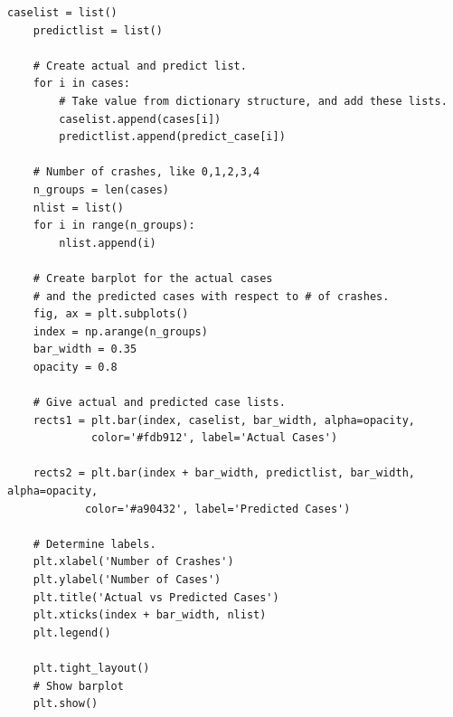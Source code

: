 \documentclass[a4 paper]{article}
\numberwithin{equation}{section}
\newcommand{\0}{\mathbf{0}}
\begin{document}
\begin{itemize}
\begin{lstlisting}[label={list:first},caption=The code block d - Draw the barplot]
	caselist = list()
	predictlist = list()

	# Create actual and predict list.
	for i in cases:
		# Take value from dictionary structure, and add these lists.
		caselist.append(cases[i])
		predictlist.append(predict_case[i])

	# Number of crashes, like 0,1,2,3,4
	n_groups = len(cases)
	nlist = list()
	for i in range(n_groups):
		nlist.append(i)

	# Create barplot for the actual cases
	# and the predicted cases with respect to # of crashes.
	fig, ax = plt.subplots()
	index = np.arange(n_groups)
	bar_width = 0.35
	opacity = 0.8

	# Give actual and predicted case lists.
	rects1 = plt.bar(index, caselist, bar_width, alpha=opacity,
			 color='#fdb912', label='Actual Cases')

	rects2 = plt.bar(index + bar_width, predictlist, bar_width, alpha=opacity,
			color='#a90432', label='Predicted Cases')

	# Determine labels.
	plt.xlabel('Number of Crashes')
	plt.ylabel('Number of Cases')
	plt.title('Actual vs Predicted Cases')
	plt.xticks(index + bar_width, nlist)
	plt.legend()

	plt.tight_layout()
	# Show barplot
	plt.show()
\end{lstlisting}
	
\end{itemize}
\end{document}
